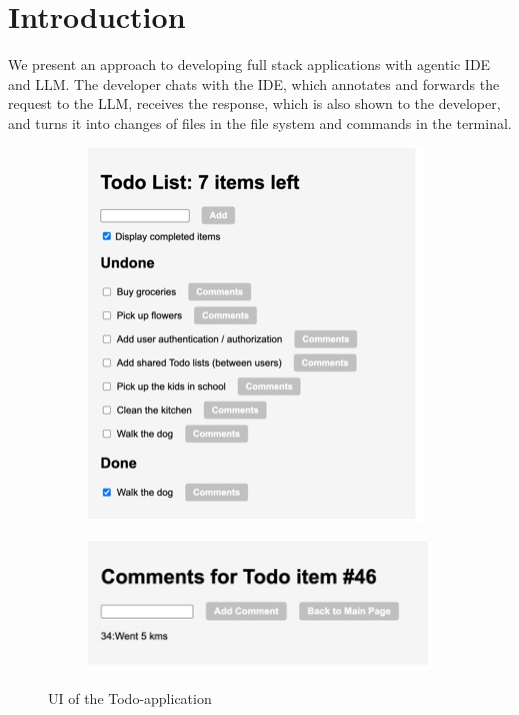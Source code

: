 \documentclass[runningheads]{llncs}
\begin{document}
\section{Introduction}\label{sec:introduction}
We present an approach to developing full stack applications with agentic IDE and LLM. The developer chats with the IDE, which annotates and forwards the request to the LLM, receives the response, which is also shown to the developer, and turns it into changes of files in the file system and commands in the terminal.
\begin{figure}[h]
    \centering
    \begin{subfigure}{0.38\textwidth}
        \centering
        \includegraphics[width=\textwidth]{Pictures/Picture1.jpg}
    \end{subfigure}%
    \begin{subfigure}{0.38\textwidth}
        \centering
        \includegraphics[width=\textwidth]{Pictures/Picture2.jpg}
    \end{subfigure}
    \caption{UI of the Todo-application}
    \label{fig:todo}
\end{figure}
\end{document}
